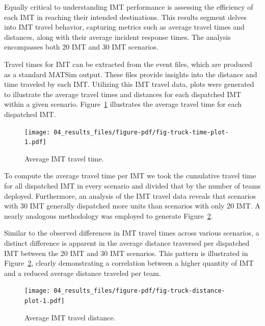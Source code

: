 \documentclass[fancy, oneside, mastersfancy, ms]{byuthesis}
\begin{document}
Equally critical to understanding IMT performance is assessing the
efficiency of each IMT in reaching their intended destinations. This
results segment delves into IMT travel behavior, capturing metrics such
as average travel times and distances, along with their average incident
response times. The analysis encompasses both 20 IMT and 30 IMT
scenarios.

Travel times for IMT can be extracted from the event files, which are
produced as a standard MATSim output. These files provide insights into
the distance and time traveled by each IMT. Utilizing this IMT travel
data, plots were generated to illustrate the average travel times and
distances for each dispatched IMT within a given scenario.
Figure~\ref{fig-truck-time-plot} illustrates the average travel time for
each dispatched IMT.

\begin{figure}

{\centering \texttt{[image: 04\_results\_files/figure-pdf/fig-truck-time-plot-1.pdf]}

}

\caption{\label{fig-truck-time-plot}Average IMT travel time.}

\end{figure}

To compute the average travel time per IMT we took the cumulative travel
time for all dispatched IMT in every scenario and divided that by the
number of teams deployed. Furthermore, an analysis of the IMT travel
data reveals that scenarios with 30 IMT generally dispatched more units
than scenarios with only 20 IMT. A nearly analogous methodology was
employed to generate Figure~\ref{fig-truck-distance-plot}.

Similar to the observed differences in IMT travel times across various
scenarios, a distinct difference is apparent in the average distance
traversed per dispatched IMT between the 20 IMT and 30 IMT scenarios.
This pattern is illustrated in Figure~\ref{fig-truck-distance-plot},
clearly demonstrating a correlation between a higher quantity of IMT and
a reduced average distance traveled per team.

\begin{figure}

{\centering \texttt{[image: 04\_results\_files/figure-pdf/fig-truck-distance-plot-1.pdf]}

}

\caption{\label{fig-truck-distance-plot}Average IMT travel distance.}

\end{figure}
\end{document}
